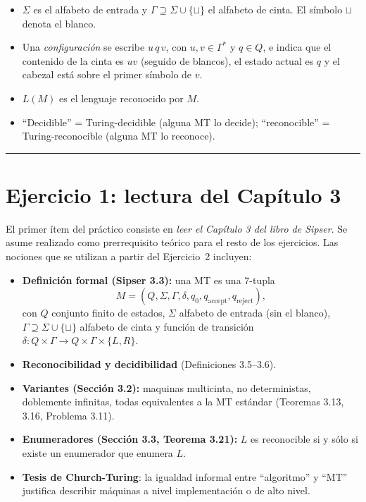 \documentclass[11pt,a4paper]{article}
\theoremstyle{plain}
\theoremstyle{definition}
\theoremstyle{remark}
\newcommand{\qaccept}{q_{\text{accept}}}
\newcommand{\qreject}{q_{\text{reject}}}
\newcommand{\blank}{\sqcup}
\begin{document}
\begin{itemize}
  \item $\Sigma$ es el alfabeto de entrada y $\Gamma\supseteq\Sigma\cup\{\blank\}$
        el alfabeto de cinta. El s\'imbolo $\blank$ denota el blanco.
  \item Una \emph{configuraci\'on} se escribe $u\,q\,v$, con $u,v\in\Gamma^*$
        y $q\in Q$, e indica que el contenido de la cinta es $uv$ (seguido
        de blancos), el estado actual es $q$ y el cabezal est\'a sobre el
        primer s\'imbolo de $v$.
  \item $L(M)$ es el lenguaje reconocido por $M$.
  \item ``Decidible'' = Turing-decidible (alguna MT lo decide); ``reconocible''
        = Turing-reconocible (alguna MT lo reconoce).
\end{itemize}

\bigskip\hrule\bigskip

\section{Ejercicio 1: lectura del Cap\'itulo 3}
\label{sec:ej1}

El primer \'item del pr\'actico consiste en \emph{leer el Cap\'itulo 3 del
libro de Sipser}. Se asume realizado como prerrequisito te\'orico para el
resto de los ejercicios. Las nociones que se utilizan a partir del
Ejercicio~2 incluyen:

\begin{itemize}
  \item \textbf{Definici\'on formal (Sipser 3.3):} una MT es una 7-tupla
        \[
          M = (Q, \Sigma, \Gamma, \delta, q_0, \qaccept, \qreject),
        \]
        con $Q$ conjunto finito de estados, $\Sigma$ alfabeto de entrada
        (sin el blanco), $\Gamma\supseteq \Sigma\cup\{\blank\}$ alfabeto de
        cinta y funci\'on de transici\'on $\delta:Q\times\Gamma\to Q\times\Gamma\times\{L,R\}$.
  \item \textbf{Reconocibilidad y decidibilidad} (Definiciones 3.5--3.6).
  \item \textbf{Variantes (Secci\'on 3.2):} maquinas multicinta, no
        deterministas, doblemente infinitas, todas equivalentes a la MT
        est\'andar (Teoremas 3.13, 3.16, Problema 3.11).
  \item \textbf{Enumeradores (Secci\'on 3.3, Teorema 3.21):} $L$ es
        reconocible si y s\'olo si existe un enumerador que enumera $L$.
  \item \textbf{Tesis de Church-Turing}: la igualdad informal entre
        ``algoritmo'' y ``MT'' justifica describir m\'aquinas a nivel
        implementaci\'on o de alto nivel.
\end{itemize}
\end{document}
